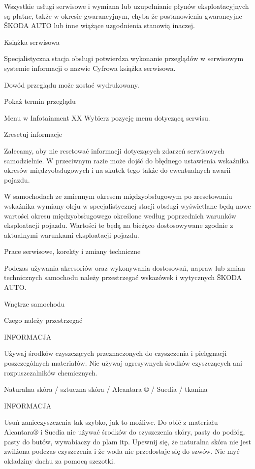 Wszystkie usługi serwisowe i wymiana lub uzupełnianie płynów eksploatacyjnych są płatne, także w okresie gwarancyjnym, chyba że postanowienia gwarancyjne ŠKODA AUTO lub inne wiążące uzgodnienia stanowią inaczej.

Książka serwisowa

Specjalistyczna stacja obsługi potwierdza wykonanie przeglądów w serwisowym systemie informacji o nazwie Cyfrowa książka serwisowa.

Dowód przeglądu może zostać wydrukowany.

Pokaż termin przeglądu

\begin{itemizeArrow}
	\itemArrow Menu w Infotainment XX Wybierz pozycję menu dotyczącą serwisu.
\end{itemizeArrow}

Zresetuj informacje

Zalecamy, aby nie resetować informacji dotyczących zdarzeń serwisowych samodzielnie. W przeciwnym razie może dojść do błędnego ustawienia wskaźnika okresów międzyobsługowych i na skutek tego także do ewentualnych awarii pojazdu.

W samochodach ze zmiennym okresem międzyobsługowym po zresetowaniu wskaźnika wymiany oleju w specjalistycznej stacji obsługi wyświetlane będą nowe wartości okresu międzyobsługowego określone według poprzednich warunków eksploatacji pojazdu. Wartości te będą na bieżąco dostosowywane zgodnie z aktualnymi warunkami eksploatacji pojazdu.

Prace serwisowe, korekty i zmiany techniczne

Podczas używania akcesoriów oraz wykonywania dostosowań, napraw lub zmian technicznych samochodu należy przestrzegać wskazówek i wytycznych ŠKODA AUTO.

Wnętrze samochodu

Czego należy przestrzegać

INFORMACJA
\begin{itemizeTriangle}
	\itemTriangle Używaj środków czyszczących przeznaczonych do czyszczenia i pielęgnacji poszczególnych materiałów.
	\itemTriangle Nie używaj agresywnych środków czyszczących ani rozpuszczalników chemicznych.
\end{itemizeTriangle}
Naturalna skóra / sztuczna skóra / Alcantara ® / Suedia / tkanina

INFORMACJA
\begin{itemizeTriangle}
	\itemTriangle Usuń zanieczyszczenia tak szybko, jak to możliwe.
	\itemTriangle Do obić z materiału Alcantara® i Suedia nie używać środków do czyszczenia skóry, pasty do podłóg, pasty do butów, wywabiaczy do plam itp.
	\itemTriangle Upewnij się, że naturalna skóra nie jest zwilżona podczas czyszczenia i że woda nie przedostaje się do szwów.
	\itemTriangle Nie myć okładziny dachu za pomocą szczotki.
\end{itemizeTriangle}

